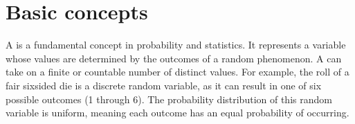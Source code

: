 \documentclass[letterpaper,10pt,english]{jupyterBook}
\begin{document}
\section{Basic concepts}
\label{\detokenize{notebooks/review_stats:basic-concepts}}
\sphinxAtStartPar
A  is a fundamental concept in probability and statistics. It represents a variable whose values are determined by the outcomes of a random phenomenon. A  can take on a finite or countable number of distinct values. For example, the roll of a fair six\sphinxhyphen{}sided die is a discrete random variable, as it can result in one of six possible outcomes (1 through 6). The probability distribution of this random variable is uniform, meaning each outcome has an equal probability of occurring.
\end{document}
